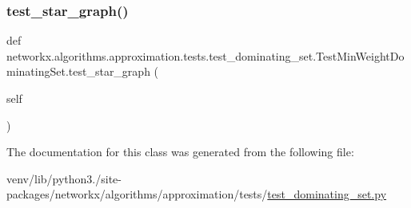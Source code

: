 \subsubsection{\texorpdfstring{test\+\_\+star\+\_\+graph()}{test\_star\_graph()}}
{\footnotesize\ttfamily def networkx.\+algorithms.\+approximation.\+tests.\+test\+\_\+dominating\+\_\+set.\+Test\+Min\+Weight\+Dominating\+Set.\+test\+\_\+star\+\_\+graph (\begin{DoxyParamCaption}\item[{}]{self }\end{DoxyParamCaption})}

 

The documentation for this class was generated from the following file\+:\begin{DoxyCompactItemize}
\item 
venv/lib/python3./site-\/packages/networkx/algorithms/approximation/tests/\hyperlink{test__dominating__set_8py}{test\+\_\+dominating\+\_\+set.\+py}\end{DoxyCompactItemize}

